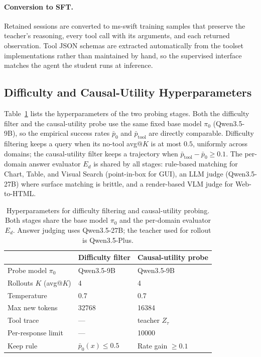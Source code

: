 \paragraph{Conversion to SFT.}
Retained sessions are converted to ms-swift training samples that preserve the teacher's reasoning, every tool call with its arguments, and each returned observation. Tool JSON schemas are extracted automatically from the toolset implementations rather than maintained by hand, so the supervised interface matches the agent the student runs at inference.

\subsection{Difficulty and Causal-Utility Hyperparameters}
\label{app:hyperparams}

Table~\ref{tab:hparams} lists the hyperparameters of the two probing stages. Both the difficulty filter and the causal-utility probe use the same fixed base model $\pi_0$ (Qwen3.5-9B), so the empirical success rates $\bar{p}_0$ and $\bar{p}_{\mathrm{tool}}$ are directly comparable. Difficulty filtering keeps a query when its no-tool avg@$K$ is at most $0.5$, uniformly across domains; the causal-utility filter keeps a trajectory when $\bar{p}_{\mathrm{tool}}-\bar{p}_0\ge 0.1$. The per-domain answer evaluator $E_d$ is shared by all stages: rule-based matching for Chart, Table, and Visual Search (point-in-box for GUI), an LLM judge (Qwen3.5-27B) where surface matching is brittle, and a render-based VLM judge for Web-to-HTML.

\begin{table}[t]
\centering
\small
\setlength{\tabcolsep}{4pt}
\begin{tabular}{lll}
\toprule
 & Difficulty filter & Causal-utility probe \\
\midrule
Probe model $\pi_0$ & Qwen3.5-9B & Qwen3.5-9B \\
Rollouts $K$ (avg@$K$) & 4 & 4 \\
Temperature & 0.7 & 0.7 \\
Max new tokens & 32768 & 16384 \\
Tool trace & --- & teacher $Z_\tau$ \\
Per-response limit & --- & 10000 \\
Keep rule & $\bar{p}_0(x)\le 0.5$ & Rate gain $\ge 0.1$ \\
\bottomrule
\end{tabular}
\caption{Hyperparameters for difficulty filtering and causal-utility probing. Both stages share the base model $\pi_0$ and the per-domain evaluator $E_d$. Answer judging uses Qwen3.5-27B; the teacher used for rollout is Qwen3.5-Plus.}
\label{tab:hparams}
\end{table}

